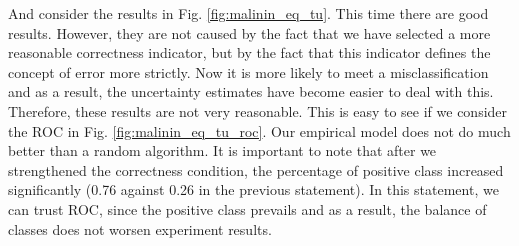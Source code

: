 \documentclass[a4paper,14pt]{extarticle}
\begin{document}
	And consider the results in Fig. \ref{fig:malinin_eq_tu}. This time there are good results. However, they are not caused by the fact that we have selected a more reasonable correctness indicator, but by the fact that this indicator defines the concept of error more strictly. Now it is more likely to meet a misclassification and as a result, the uncertainty estimates have become easier to deal with this. Therefore, these results are not very reasonable. This is easy to see if we consider the ROC in Fig. \ref{fig:malinin_eq_tu_roc}. Our empirical model does not do much better than a random algorithm. It is important to note that after we strengthened the correctness condition, the percentage of positive class increased significantly (0.76 against 0.26 in the previous statement). In this statement, we can trust ROC, since the positive class prevails and as a result, the balance of classes does not worsen experiment results.
	
\end{document}
